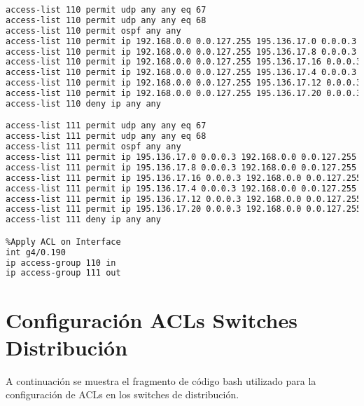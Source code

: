 \begin{lstlisting}[language=Bash, caption={Configuración ACLs Routers}]
%Declare ACL
access-list 110 permit udp any any eq 67            
access-list 110 permit udp any any eq 68
access-list 110 permit ospf any any
access-list 110 permit ip 192.168.0.0 0.0.127.255 195.136.17.0 0.0.0.3
access-list 110 permit ip 192.168.0.0 0.0.127.255 195.136.17.8 0.0.0.3
access-list 110 permit ip 192.168.0.0 0.0.127.255 195.136.17.16 0.0.0.3
access-list 110 permit ip 192.168.0.0 0.0.127.255 195.136.17.4 0.0.0.3
access-list 110 permit ip 192.168.0.0 0.0.127.255 195.136.17.12 0.0.0.3
access-list 110 permit ip 192.168.0.0 0.0.127.255 195.136.17.20 0.0.0.3
access-list 110 deny ip any any

access-list 111 permit udp any any eq 67            
access-list 111 permit udp any any eq 68
access-list 111 permit ospf any any
access-list 111 permit ip 195.136.17.0 0.0.0.3 192.168.0.0 0.0.127.255 
access-list 111 permit ip 195.136.17.8 0.0.0.3 192.168.0.0 0.0.127.255 
access-list 111 permit ip 195.136.17.16 0.0.0.3 192.168.0.0 0.0.127.255 
access-list 111 permit ip 195.136.17.4 0.0.0.3 192.168.0.0 0.0.127.255 
access-list 111 permit ip 195.136.17.12 0.0.0.3 192.168.0.0 0.0.127.255 
access-list 111 permit ip 195.136.17.20 0.0.0.3 192.168.0.0 0.0.127.255 
access-list 111 deny ip any any

%Apply ACL on Interface
int g4/0.190
ip access-group 110 in
ip access-group 111 out
\end{lstlisting}

\section{Configuración ACLs Switches Distribución}\label{anexo:acldistr}
A continuación se muestra el fragmento de código bash utilizado para la configuración de ACLs en los switches de distribución.

